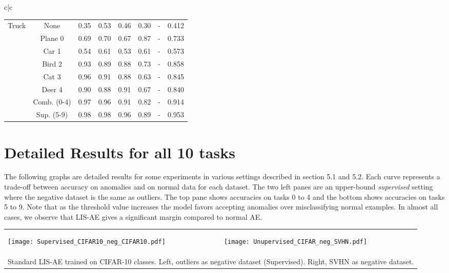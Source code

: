 \documentclass[acmtog, nonacm]{acmart}
\begin{document}
\begin{tabular}{c|c}
\begin{tabular}{@{}c|c|ccccc|c@{}}
                       \midrule
\multirow{8}{*}{Truck} & None                      & 0.35 & 0.53 & 0.46  & 0.30 & -     & 0.412                \\
                       & Plane 0                   & 0.69 & 0.70 & 0.67  & 0.87 & -     & 0.733                \\
                       & Car 1                     & 0.54 & 0.61 & 0.53  & 0.61 & -     & 0.573                \\
                       & Bird 2                    & 0.93 & 0.89 & 0.88  & 0.73 & -     & 0.858                \\
                       & Cat 3                     & 0.96 & 0.91 & 0.88  & 0.63 & -     & 0.845                \\
                       & Deer 4                    & 0.90 & 0.88 & 0.91  & 0.67 & -     & 0.840                \\
                       & Comb. (0-4)               & 0.97 & 0.96 & 0.91  & 0.82 & -     & 0.914                \\
                       & Sup. (5-9)                & 0.98 & 0.98 & 0.96  & 0.89 & -     & 0.953  
\\
\midrule
\end{tabular}
\end{tabular}

\newpage
\section{Detailed Results for all 10 tasks}



\vspace{.2cm}
The following graphs are detailed results for some experiments in various settings described in section 5.1 and 5.2. Each curve represents a trade-off between accuracy on anomalies and on normal data for each dataset. The two left panes are an upper-bound  \textit{supervised} setting where the negative dataset is the same as outliers. The top pane shows accuracies on tasks 0 to 4 and the bottom shows accuracies on tasks 5 to 9. Note that as the threshold value  increases the model favors accepting anomalies over misclassifying normal examples. In almost all cases, we observe that LIS-AE gives a significant margin compared to normal AE.
\\
\begin{tabular}{ll}
     \\
     \\\\
     \texttt{[image: Supervised\_CIFAR10\_neg\_CIFAR10.pdf]}&
     \texttt{[image: Unupervised\_CIFAR\_neg\_SVHN.pdf]}\\\\\\\\
     \multicolumn{2}{c}{Standard LIS-AE trained on CIFAR-10 classes. Left, outliers as negative dataset (Supervised). Right, SVHN as negative dataset.}
\end{tabular}\\
\end{document}
